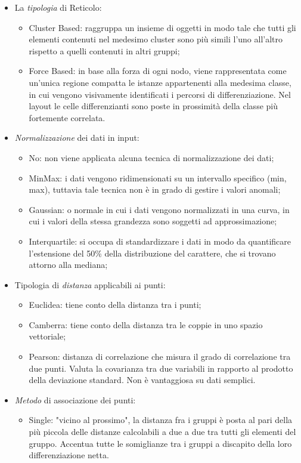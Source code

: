 \begin{itemize}
\item La \textit{tipologia} di Reticolo:
\begin{itemize}
\item Cluster Based: raggruppa un insieme di oggetti in modo tale che tutti gli elementi contenuti nel medesimo cluster sono pi\`u simili l'uno all'altro rispetto a quelli contenuti in altri gruppi;
\item Force Based: in base alla forza di ogni nodo, viene rappresentata come un'unica regione compatta le istanze appartenenti alla medesima classe, in cui vengono visivamente identificati i percorsi di differenziazione. Nel layout le celle differenzianti sono poste in prossimit\`a della classe pi\`u fortemente correlata.
\end{itemize}
\item \textit{Normalizzazione} dei dati in input:
\begin{itemize}
\item No: non viene applicata alcuna tecnica di normalizzazione dei dati;
\item MinMax: i dati vengono ridimensionati su un intervallo specifico (min, max), tuttavia tale tecnica non \`e in grado di gestire i valori anomali;
\item Gaussian: o normale in cui i dati vengono normalizzati in una curva, in cui i valori della stessa grandezza sono soggetti ad approssimazione;
\item Interquartile: si occupa di standardizzare i dati in modo da quantificare l'estensione del 50\% della distribuzione del carattere, che si trovano attorno alla mediana;
\end{itemize}
\item Tipologia di \textit{distanza} applicabili ai punti:
\begin{itemize}
\item Euclidea: tiene conto della distanza tra i punti;
\item Camberra: tiene conto della distanza tra le coppie in uno spazio vettoriale;
\item Pearson: distanza di correlazione che misura il grado di correlazione tra due punti. Valuta la covarianza tra due variabili in rapporto al prodotto della deviazione standard. Non \`e vantaggiosa su dati semplici.
\end{itemize}
\item \textit{Metodo} di associazione dei punti:
\begin{itemize}
\item Single: "vicino al prossimo", la distanza fra i gruppi \`e posta al pari della pi\`u piccola delle distanze calcolabili a due a due tra tutti gli elementi del gruppo. Accentua tutte le somiglianze tra i gruppi a discapito  della loro differenziazione netta.

\end{itemize}
\end{itemize}

